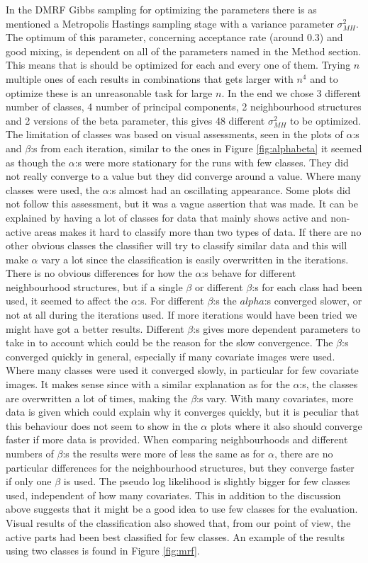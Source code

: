 \documentclass[a4paper,english]{article}
\begin{document}
In the DMRF Gibbs sampling for optimizing the parameters there is as mentioned a Metropolis Hastings sampling stage with a variance parameter  $\sigma_{MH}^2$.
The optimum of this parameter, concerning acceptance rate (around $0.3$) and good mixing, is dependent on all of the parameters named in the Method section.
This means that is should be optimized for each and every one of them.
Trying $n$ multiple ones of each results in combinations that gets larger with $n^4$ and to optimize these is an unreasonable task for large $n$.
In the end we chose 3 different number of classes, 4 number of principal components, 2 neighbourhood structures and 2 versions of the beta parameter, this gives 48 different $\sigma_{MH}^2$ to be optimized. The limitation of classes was based on visual assessments, seen in the plots of $\alpha$:s and $\beta$:s from each iteration, similar to the ones in Figure \ref{fig:alphabeta} it seemed as though the $\alpha$:s were more stationary for the runs with few classes. They did not really converge to a value but they did converge around a value. Where many classes were used, the $\alpha$:s almost had an oscillating appearance. Some plots did not follow this assessment, but it was a vague assertion that was made.
It can be explained by having a lot of classes for data that mainly shows active and non-active areas makes it hard to classify more than two types of data. If there are no other obvious classes the classifier will try to classify similar data and this will make $\alpha$ vary a lot since the classification is easily overwritten in the iterations. There is no obvious differences for how the $\alpha$:s behave for different neighbourhood structures, but if a single $\beta$ or different $\beta$:s for each class had been used, it seemed to affect the $\alpha$:s. For different $\beta$:s the $alpha$:s converged slower, or not at all during the iterations used. If more iterations would have been tried we might have got a better results. Different $\beta$:s gives more dependent parameters to take in to account which could be the reason for the slow convergence. 
The $\beta$:s converged quickly in general, especially if many covariate images were used. Where many classes were used it converged slowly, in particular for few covariate images. It makes sense since with a similar explanation as for the $\alpha$:s, the classes are overwritten a lot of times, making the $\beta$:s vary. With many covariates, more data is given which could explain why it converges quickly, but it is peculiar that this behaviour does not seem to show in the $\alpha$ plots where it also should converge faster if more data is provided. When comparing neighbourhoods and different numbers of $\beta$:s the results were more of less the same as for $\alpha$, there are no particular differences for the neighbourhood structures, but they converge faster if only one $\beta$ is used. 
The pseudo log likelihood is slightly bigger for few classes used, independent of how many covariates. This in addition to the discussion above suggests that it might be a good idea to use few classes for the evaluation. Visual results of the classification also showed that, from our point of view, the active parts had been best classified for few classes. An example of the results using two classes is found in Figure \ref{fig:mrf}.
\end{document}
